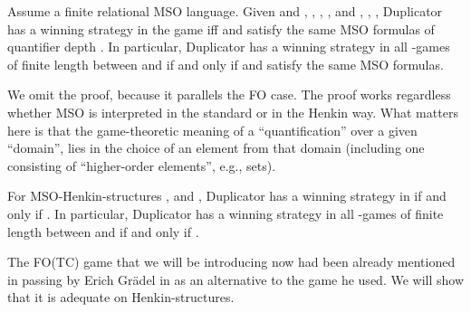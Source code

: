 \documentclass{LMCS}
\newcommand{\fo}{\textsf{FO}\xspace}
\newcommand{\mso}{\textsf{MSO}\xspace}
\newcommand{\fotc}{\textsf{FO(TC)}\xspace}
\begin{document}
\begin{thm}[\mso Adequacy]\label{thm:efmso}
 Assume a finite relational \mso language. Given  and , , , ,  and  , , ,
 Duplicator has a winning strategy in the game  iff
  and  satisfy
 the same \mso formulas of quantifier depth . In
 particular, Duplicator has a winning strategy in all -games of finite length between 
 and  if and only if  and  satisfy the same \mso formulas.
\end{thm}

We omit the proof, because it parallels the \fo case.
The proof works regardless whether \mso is interpreted in the standard or in the Henkin way. What matters here is that the game-theoretic meaning of a ``quantification'' over a given ``domain'', lies in the choice of an element from that domain (including one consisting of ``higher-order elements'', e.g., sets).

\begin{cor}
For \mso-Henkin-structures ,  and , Duplicator has a winning strategy in  if and only if . In particular, Duplicator has a winning strategy in all -games of finite length between  and  if and only if .
\end{cor}


The \fotc game that we will be introducing now had been already mentioned in passing by Erich Gr\"{a}del in \cite{736267} as an alternative to the game he used. We will show that it is adequate on Henkin-structures.
\end{document}
